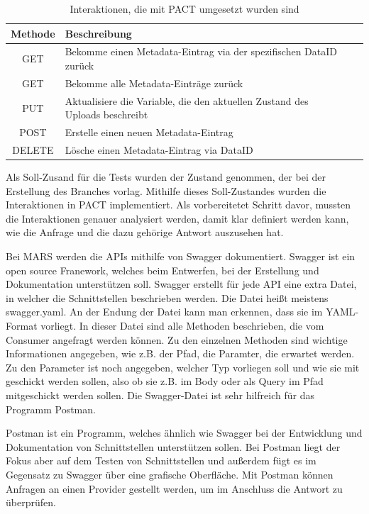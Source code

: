\documentclass{llncs}
\begin{document}
\begin{table}[htbp]
\centering
\begin{tabular}{|c|l|p{4cm}|p{4cm}|}
\hline
\multicolumn{1}{|l|}{Methode} & Beschreibung \\ \hline
GET & Bekomme einen Metadata-Eintrag via der spezifischen DataID zurück\\ \hline
GET & Bekomme alle Metadata-Einträge zurück \\ \hline
PUT & Aktualisiere die Variable, die den aktuellen Zustand des Uploads beschreibt \\ \hline
POST & Erstelle einen neuen Metadata-Eintrag \\ \hline
DELETE & Lösche einen Metadata-Eintrag via DataID\\ \hline
\end{tabular}
\caption{Interaktionen, die mit PACT umgesetzt wurden sind}
\label{tab:Interaktionen_PACT}
\end{table}

Als Soll-Zusand für die Tests wurden der Zustand genommen, der bei der Erstellung des Branches vorlag. Mithilfe dieses Soll-Zustandes wurden die Interaktionen in PACT implementiert. Als vorbereitetet Schritt davor, mussten die Interaktionen genauer analysiert werden, damit klar definiert werden kann, wie die Anfrage und die dazu gehörige Antwort auszusehen hat.

Bei MARS werden die APIs mithilfe von Swagger\citep{swagger} dokumentiert. Swagger ist ein open source Franework, welches beim Entwerfen, bei der Erstellung und Dokumentation unterstützen soll. Swagger erstellt für jede API eine extra Datei, in welcher die Schnittstellen beschrieben werden. Die Datei heißt meistens swagger.yaml. An der Endung der Datei kann man erkennen, dass sie im YAML-Format vorliegt. In dieser Datei sind alle Methoden beschrieben, die vom Consumer angefragt werden können. Zu den einzelnen Methoden sind wichtige Informationen angegeben, wie z.B. der Pfad, die Paramter, die erwartet werden. Zu den Parameter ist noch angegeben, welcher Typ vorliegen soll und wie sie mit geschickt werden sollen, also ob sie z.B. im Body oder als Query im Pfad mitgeschickt werden sollen. Die Swagger-Datei ist sehr hilfreich für das Programm Postman.

Postman \cite{postman} ist ein Programm, welches ähnlich wie Swagger bei der Entwicklung und Dokumentation von Schnittstellen unterstützen sollen. Bei Postman liegt der Fokus aber auf dem Testen von Schnittstellen und außerdem fügt es im Gegensatz zu Swagger über eine grafische Oberfläche. Mit Postman können Anfragen an einen Provider gestellt werden, um im Anschluss die Antwort zu überprüfen. 
\end{document}
